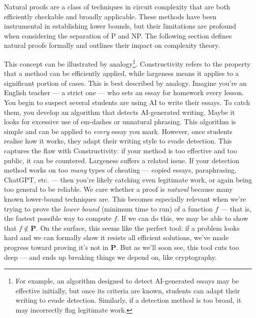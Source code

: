 \documentclass[12pt]{report}
\begin{document}
Natural proofs are a class of techniques in circuit complexity that are both efficiently checkable and broadly applicable. These methods have been instrumental in establishing lower bounds, but their limitations are profound when considering the separation of P and NP. The following section defines natural proofs formally and outlines their impact on complexity theory.

This concept can be illustrated by analogy\footnote{For example, an algorithm designed to detect AI-generated essays may be effective initially, but once its criteria are known, students can adapt their writing to evade detection. Similarly, if a detection method is too broad, it may incorrectly flag legitimate work.}. 
Constructivity refers to the property that a method can be efficiently applied, while largeness means it applies to a significant portion of cases.
This is best described by analogy.  
Imagine you're an English teacher --- a strict one --- who sets an essay for homework every lesson. You begin to suspect several students are using AI to write their essays.  
To catch them, you develop an algorithm that detects AI-generated writing.
Maybe it looks for excessive use of em-dashes or unnatural phrasing.
This algorithm is simple and can be applied to \textit{every} essay you mark.  
However, once students realise how it works, they adapt their writing style to evade detection.  
This captures the flaw with Constructivity: if your method is too effective and too public, it can be countered.
Largeness suffers a related issue. If your detection method works on too \textit{many} types of cheating --- copied essays, paraphrasing, ChatGPT, etc. --- then you're likely catching even legitimate work, or again being too general to be reliable.
\vspace{0.5cm}
\newline
We care whether a proof is \textit{natural} because many known lower-bound techniques are.  
This becomes especially relevant when we're trying to prove the \textit{lower bound} (minimum time to run) of a function $f$ --- that is, the fastest possible way to compute $f$.  
If we can do this, we may be able to show that $f \notin \mathbf{P}$.
\vspace{0.5cm}
\newline
On the surface, this seems like the perfect tool: if a problem looks hard and we can formally show it resists all efficient solutions, we've made progress toward proving it's not in $\mathbf{P}$.
But as we'll soon see, this tool cuts too deep --- and ends up breaking things we depend on, like cryptography.
\end{document}
